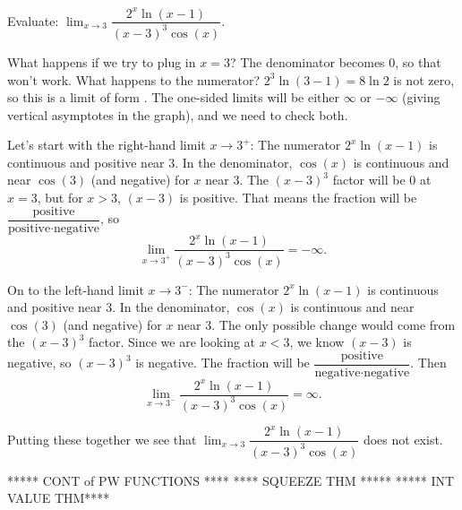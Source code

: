 \documentclass{ximera}
\begin{document}
\begin{example}
	Evaluate: $\displaystyle \lim_{x\to 3} \dfrac{2^x \ln(x-1)}{(x-3)^3\cos(x)}$.
	\begin{explanation}
		What happens if we try to plug in $x=3$?  The denominator becomes $0$, so that won't work.  What happens to the numerator?
		$2^3 \ln(3-1) = 8 \ln 2$ is not zero, so this is a limit of form \numOverZero.  The one-sided limits will be either $\infty$ or $-\infty$ (giving vertical asymptotes in the graph),
		and we need to check both.
		
		Let's start with the right-hand limit $x \to 3^+$:
		The numerator $2^x \ln(x-1)$ is continuous and positive near $3$.  In the denominator, $\cos(x)$ is continuous and near $\cos(3)$ (and negative) for $x$ near $3$.
		The $(x-3)^3$ factor will be $0$ at $x=3$, but for $x > 3$, $(x-3)$ is positive.  That means the fraction will be $\dfrac{\textrm{positive}}{\textrm{positive}\cdot\textrm{negative}}$, so
		\[ \lim_{x\to 3^+} \dfrac{ 2^x \ln(x-1)}{(x-3)^3 \cos(x)} = -\infty. \]
		
		On to the left-hand limit $x \to 3^-$:
		The numerator $2^x \ln(x-1)$ is continuous and positive near $3$.  In the denominator, $\cos(x)$ is continuous and near $\cos(3)$ (and negative) for $x$ near $3$.  
		The only possible change would come from the $(x-3)^3$ factor.  Since we are looking at $x < 3$, we know $(x-3)$ is negative, so $(x-3)^3$ is negative.  The fraction
		will be $\dfrac{\textrm{positive}}{\textrm{negative}\cdot\textrm{negative}}$.  Then \[ \lim_{x\to 3^-} \dfrac{2^x \ln(x-1)}{(x-3)^3 \cos(x)} = \infty. \]
		
		Putting these together we see that $\displaystyle \lim_{x\to 3}\dfrac{ 2^x \ln(x-1)}{(x-3)^3 \cos(x)}$ does not exist.
	\end{explanation}
\end{example}
	

***** CONT of PW FUNCTIONS ****
**** SQUEEZE THM *****
***** INT VALUE THM****
\end{document}
